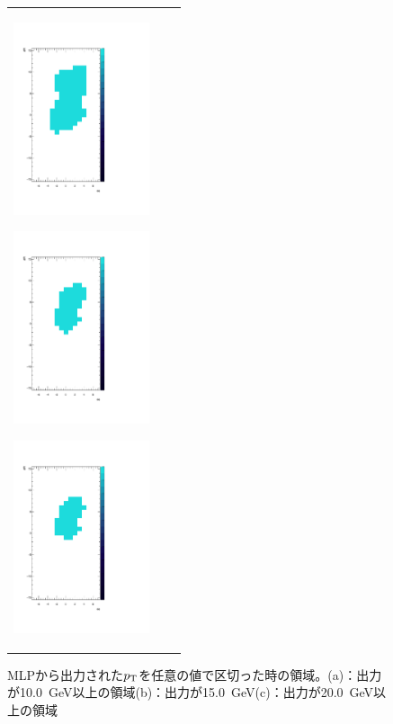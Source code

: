 \begin{figure}
    \centering
    \begin{tabular}{ccc}
    \centering
    \begin{minipage}[b]{0.33\hsize}%
        \centering
        \includegraphics[clip, width=4cm]{fig/4/cut1_output.pdf}
        \subcaption{}
        \label{cut1}
    \end{minipage}%
    \begin{minipage}[b]{0.33\hsize}%
        \centering
        \includegraphics[clip, width=4cm]{fig/4/cut2_output.pdf}
        \subcaption{}
        \label{cut2}
    \end{minipage}%
    \begin{minipage}[b]{0.33\hsize}%
        \centering
        \includegraphics[clip, width=4cm]{fig/4/cut3_output.pdf}
        \subcaption{}
        \label{cut3}
    \end{minipage}%
    \end{tabular}
    \caption{MLPから出力された$p_{\rm{T}}$を任意の値で区切った時の領域。(a)：出力が10.0~GeV以上の領域(b)：出力が15.0~GeV(c)：出力が20.0~GeV以上の領域}
    \label{ninninoCut}
\end{figure}

